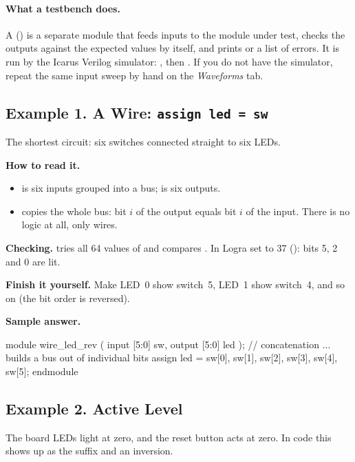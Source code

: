 \paragraph{What a testbench does.} A  () is a
separate module that feeds inputs to the module under test, checks the outputs
against the expected values by itself, and prints  or a list of
errors. It is run by the Icarus Verilog simulator:
, then .
If you do not have the simulator, repeat the same input sweep by hand on the
\emph{Waveforms} tab.

\subsection{Example 1. A Wire: \texttt{assign led = sw}}

The shortest circuit: six switches connected straight to six LEDs.


\textbf{How to read it.}
\begin{itemize}
  \item {} is six inputs grouped into a bus;  is six outputs.
  \item {} copies the whole bus: bit $i$ of the output equals bit $i$ of the input. There is no logic at all, only wires.
\end{itemize}
\textbf{Checking.}  tries all 64 values of  and
compares . In Logra set  to 37 (): bits 5, 2
and 0 are lit.

\textbf{Finish it yourself.} Make LED~0 show switch~5, LED~1 show switch~4, and
so on (the bit order is reversed).

\textbf{Sample answer.}
\begin{vcode}
module wire_led_rev (
    input  [5:0] sw,
    output [5:0] led
);
    // concatenation {...} builds a bus out of individual bits
    assign led = {sw[0], sw[1], sw[2], sw[3], sw[4], sw[5]};
endmodule
\end{vcode}

\subsection{Example 2. Active Level}

The board LEDs light at zero, and the reset button acts at zero. In code this
shows up as the  suffix and an inversion.


